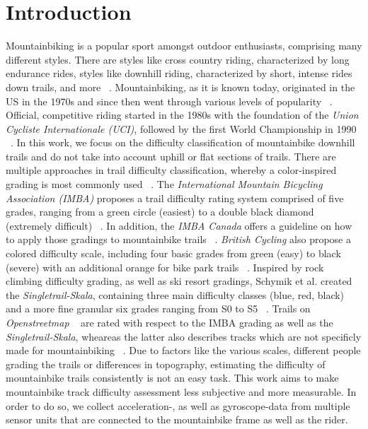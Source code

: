 \documentclass[runningheads]{llncs}
\begin{document}
\section{Introduction}
Mountainbiking is a popular sport amongst outdoor enthusiasts, comprising many different styles.
There are styles like cross country riding, characterized by long endurance rides, styles like downhill riding, characterized by short, intense rides down trails, and more ~\cite{ucidisciplines}.
Mountainbiking, as it is known today, originated in the US in the 1970s and since then went through various levels of popularity ~\cite{gaulrapp2001injuries}.
Official, competitive riding started in the 1980s with the foundation of the \textit{Union Cycliste Internationale (UCI)}, followed by the first World Championship in 1990 ~\cite{impellizzeri2007physiology}. 
In this work, we focus on the difficulty classification of mountainbike downhill trails and do not take into account uphill or flat sections of trails.
There are multiple approaches in trail difficulty classification, whereby a color-inspired grading is most commonly used ~\cite{imbarating,britishcyclinggrades,schymik2008singletrail}.
The \textit{International Mountain Bicycling Association (IMBA)} proposes a trail difficulty rating system comprised of five grades, ranging from a green circle (easiest) to a double black diamond (extremely difficult) ~\cite{imbarating}. 
In addition, the \textit{IMBA Canada} offers a guideline on how to apply those gradings to mountainbike trails ~\cite{imbaguidelines}.
\textit{British Cycling} also propose a colored difficulty scale, including four basic grades from green (easy) to black (severe) with an additional orange for bike park trails ~\cite{britishcyclinggrades}.
Inspired by  rock climbing difficulty grading, as well as ski resort gradings, Schymik et al. created the \textit{Singletrail-Skala}, containing three main difficulty classes (blue, red, black) and a more fine granular six grades ranging from S0 to S5 ~\cite{schymik2008singletrail}. 
Trails on \textit{Openstreetmap} ~\cite{openstreetmap} are rated with respect to the IMBA grading as well as the \textit{Singletrail-Skala}, wheareas the latter also describes tracks which are not specificly made for mountainbiking ~\cite{osmsingletrails}. 
Due to factors like the various scales, different people grading the trails or differences in topography, estimating the difficulty of mountainbike trails consistently is not an easy task.
This work aims to make mountainbike track difficulty assessment less subjective and more measurable.
In order to do so, we collect acceleration-, as well as gyroscope-data from multiple sensor units that are connected to the mountainbike frame as well as the rider.
\end{document}
